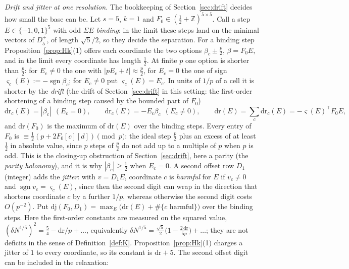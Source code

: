 \documentclass[11pt]{amsart}
\theoremstyle{definition}
\theoremstyle{plain}
\newcommand{\Z}{\mathbb{Z}}
\begin{document}
\emph{Drift and jitter at one resolution.} The bookkeeping of Section~\ref{sec:drift} decides how small the base can be. Let $s=5$, $k=1$ and $F_0\in(\frac12+\Z)^{5\times5}$. Call a step $E\in\{-1,0,1\}^5$ with odd $\Sigma E$ \emph{binding}: in the limit these steps land on the minimal vectors of $D_5^+$, of length $\sqrt5/2$, so they decide the separation. For a binding step Proposition~\ref{prop:Hk}(1) offers each coordinate the two options $\beta_c\pm\frac p2$, $\beta=F_0E$, and in the limit every coordinate has length $\frac12$. At finite $p$ one option is shorter than $\frac p2$: for $E_c\ne0$ the one with $|pE_c+t|\approx\frac p2$, for $E_c=0$ the one of sign $\varsigma_c(E):=-\operatorname{sgn}\beta_c$; for $E_c\ne0$ put $\varsigma_c(E)=E_c$. In units of $1/p$ of a cell it is shorter by the \emph{drift} (the drift of Section~\ref{sec:drift} in this setting: the first-order shortening of a binding step caused by the bounded part of $F_0$)
\[
\mathrm{dr}_c(E)=|\beta_c|\ \ (E_c=0),\qquad \mathrm{dr}_c(E)=-E_c\beta_c\ \ (E_c\ne0),\qquad \mathrm{dr}(E)=\sum_c\mathrm{dr}_c(E)=-\varsigma(E)^{\!\top}F_0E,
\]
and $\mathrm{dr}(F_0)$ is the maximum of $\mathrm{dr}(E)$ over the binding steps. Every entry of $F_0$ is $\equiv\frac12(p+2F_0[c][d])\pmod p$: the ideal step $\frac p2$ plus an excess of at least $\frac12$ in absolute value, since $p$ steps of $\frac p2$ do not add up to a multiple of $p$ when $p$ is odd. This is the closing-up obstruction of Section~\ref{sec:drift}, here a parity (the \emph{parity holonomy}), and it is why $|\beta_c|\ge\frac12$ when $E_c=0$. A second offset row $D_1$ (integer) adds the \emph{jitter}: with $v=D_1E$, coordinate $c$ is \emph{harmful} for $E$ if $v_c\ne0$ and $\operatorname{sgn}v_c=\varsigma_c(E)$, since then the second digit can wrap in the direction that shortens coordinate $c$ by a further $1/p$, whereas otherwise the second digit costs $O(p^{-2})$. Put $\mathrm{dj}(F_0,D_1)=\max_E\bigl(\mathrm{dr}(E)+\#\{c\text{ harmful}\}\bigr)$ over the binding steps. Here the first-order constants are measured on the squared value, $(\delta N^{1/5})^2=\frac54-\mathrm{dr}/p+\dots$, equivalently $\delta N^{1/5}=\frac{\sqrt5}2\bigl(1-\frac{2\,\mathrm{dr}}{5p}\bigr)+\dots$; they are not deficits in the sense of Definition~\ref{def:K}. Proposition~\ref{prop:Hk}(1) charges a jitter of $1$ to every coordinate, so its constant is $\mathrm{dr}+5$. The second offset digit can be included in the relaxation:
\end{document}
